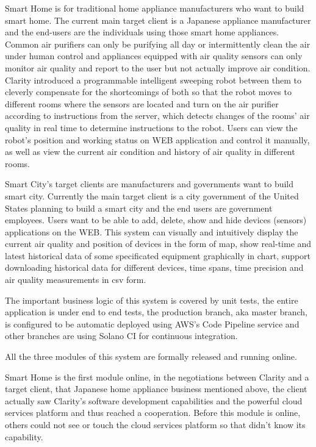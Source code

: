 Smart Home is for traditional home appliance manufacturers who want to build smart home. The current main target client is a Japanese appliance manufacturer and the end-users are the individuals using those smart home appliances. Common air purifiers can only be purifying all day or intermittently clean the air under human control and appliances equipped with air quality sensors can only monitor air quality and report to the user but not actually improve air condition. Clarity introduced a programmable intelligent sweeping robot between them to cleverly compensate for the shortcomings of both so that the robot moves to different rooms where the sensors are located and turn on the air purifier according to instructions from the server, which detects changes of the rooms' air quality in real time to determine instructions to the robot. Users can view the robot's position and working status on WEB application and control it manually, as well as view the current air condition and history of air quality in different rooms.

Smart City's target clients are manufacturers and governments want to build smart city. Currently the main target client is a city government of the United States planning to build a smart city and the end users are government employees. Users want to be able to add, delete, show and hide devices (sensors) applications on the WEB. This system can visually and intuitively display the current air quality and position of devices in the form of map, show real-time and latest historical data of some specificated equipment graphically in chart, support downloading historical data for different devices, time spans, time precision and air quality measurements in csv form.

The important business logic of this system is covered by unit tests, the entire application is under end to end tests, the production branch, aka master branch, is configured to be automatic deployed using AWS's Code Pipeline service and other branches are using Solano CI for continuous integration.

All the three modules of this system are formally released and running online.

Smart Home is the first module online, in the negotiations between Clarity and a target client, that Japanese home appliance business mentioned above, the client actually saw Clarity's software development capabilities and the powerful cloud services platform and thus reached a cooperation. Before this module is online, others could not see or touch the cloud services platform so that didn't know its capability.

